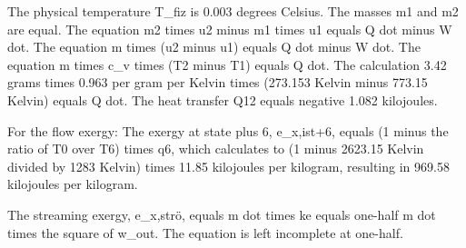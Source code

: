 The physical temperature T_fiz is 0.003 degrees Celsius.
The masses m1 and m2 are equal.
The equation m2 times u2 minus m1 times u1 equals Q dot minus W dot.
The equation m times (u2 minus u1) equals Q dot minus W dot.
The equation m times c_v times (T2 minus T1) equals Q dot.
The calculation 3.42 grams times 0.963 per gram per Kelvin times (273.153 Kelvin minus 773.15 Kelvin) equals Q dot.
The heat transfer Q12 equals negative 1.082 kilojoules.

For the flow exergy:
The exergy at state plus 6, e_x,ist+6, equals (1 minus the ratio of T0 over T6) times q6, which calculates to (1 minus 2623.15 Kelvin divided by 1283 Kelvin) times 11.85 kilojoules per kilogram, resulting in 969.58 kilojoules per kilogram.

The streaming exergy, e_x,strö, equals m dot times ke equals one-half m dot times the square of w_out. The equation is left incomplete at one-half.